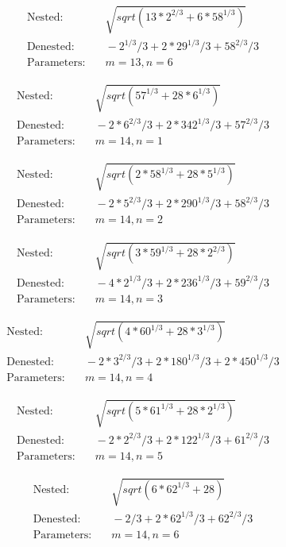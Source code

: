\begin{align*}
\text{Nested:} &\quad \sqrt{sqrt(13*2^{2/3} + 6*58^{1/3})} \\
\text{Denested:} &\quad -2^{1/3}/3 + 2*29^{1/3}/3 + 58^{2/3}/3 \\
\text{Parameters:} &\quad m=13, n=6
\end{align*}

\begin{align*}
\text{Nested:} &\quad \sqrt{sqrt(57^{1/3} + 28*6^{1/3})} \\
\text{Denested:} &\quad -2*6^{2/3}/3 + 2*342^{1/3}/3 + 57^{2/3}/3 \\
\text{Parameters:} &\quad m=14, n=1
\end{align*}

\begin{align*}
\text{Nested:} &\quad \sqrt{sqrt(2*58^{1/3} + 28*5^{1/3})} \\
\text{Denested:} &\quad -2*5^{2/3}/3 + 2*290^{1/3}/3 + 58^{2/3}/3 \\
\text{Parameters:} &\quad m=14, n=2
\end{align*}

\begin{align*}
\text{Nested:} &\quad \sqrt{sqrt(3*59^{1/3} + 28*2^{2/3})} \\
\text{Denested:} &\quad -4*2^{1/3}/3 + 2*236^{1/3}/3 + 59^{2/3}/3 \\
\text{Parameters:} &\quad m=14, n=3
\end{align*}

\begin{align*}
\text{Nested:} &\quad \sqrt{sqrt(4*60^{1/3} + 28*3^{1/3})} \\
\text{Denested:} &\quad -2*3^{2/3}/3 + 2*180^{1/3}/3 + 2*450^{1/3}/3 \\
\text{Parameters:} &\quad m=14, n=4
\end{align*}

\begin{align*}
\text{Nested:} &\quad \sqrt{sqrt(5*61^{1/3} + 28*2^{1/3})} \\
\text{Denested:} &\quad -2*2^{2/3}/3 + 2*122^{1/3}/3 + 61^{2/3}/3 \\
\text{Parameters:} &\quad m=14, n=5
\end{align*}

\begin{align*}
\text{Nested:} &\quad \sqrt{sqrt(6*62^{1/3} + 28)} \\
\text{Denested:} &\quad -2/3 + 2*62^{1/3}/3 + 62^{2/3}/3 \\
\text{Parameters:} &\quad m=14, n=6
\end{align*}

